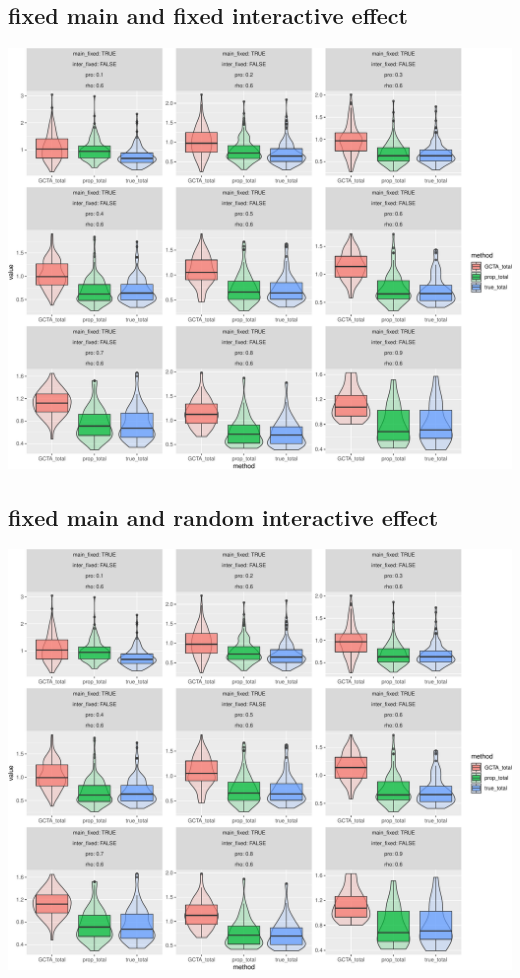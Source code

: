 \documentclass[]{article}
\begin{document}
\subsection{fixed main and fixed interactive
effect}\label{fixed-main-and-fixed-interactive-effect-1}

\includegraphics{Simulation_report_chi_resamle_files/figure-latex/fixed fixed p_6-1.pdf}

\subsection{fixed main and random interactive
effect}\label{fixed-main-and-random-interactive-effect-1}

\includegraphics{Simulation_report_chi_resamle_files/figure-latex/fixed random p_6-1.pdf}
\end{document}
